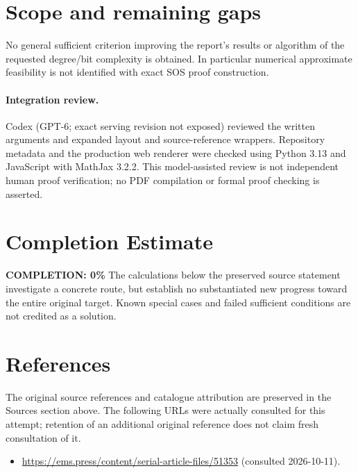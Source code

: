 \documentclass[11pt]{article}
\begin{document}
\section{Scope and remaining gaps}
No general sufficient criterion improving the report's results or algorithm of the requested degree/bit complexity is obtained. In particular numerical approximate feasibility is not identified with exact SOS proof construction.
\paragraph{Integration review.} Codex (GPT-6; exact serving revision not exposed) reviewed the written arguments and expanded layout and source-reference wrappers. Repository metadata and the production web renderer were checked using Python 3.13 and JavaScript with MathJax 3.2.2. This model-assisted review is not independent human proof verification; no PDF compilation or formal proof checking is asserted.

\section{Completion Estimate}
\noindent\textbf{COMPLETION: 0\%}
The calculations below the preserved source statement investigate a concrete route,
but establish no substantiated new progress toward the entire original target.
Known special cases and failed sufficient conditions are not credited as a solution.
\section{References}
The original source references and catalogue attribution are preserved in the
Sources section above. The following URLs were actually consulted for this attempt;
retention of an additional original reference does not claim fresh consultation of it.
\begin{itemize}
\item \url{https://ems.press/content/serial-article-files/51353} (consulted 2026-10-11). 
\end{itemize}
\end{document}
